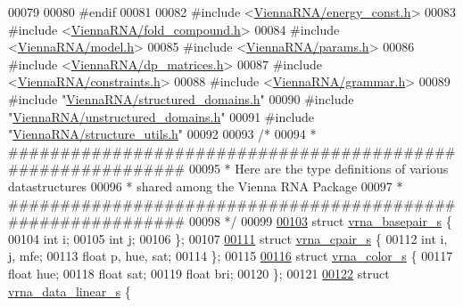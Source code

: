 \begin{DoxyCode}
00079 
00080 \textcolor{preprocessor}{#endif}
00081 
00082 \textcolor{preprocessor}{#include <\hyperlink{energy__const_8h}{ViennaRNA/energy\_const.h}>}
00083 \textcolor{preprocessor}{#include <\hyperlink{fold__compound_8h}{ViennaRNA/fold\_compound.h}>}
00084 \textcolor{preprocessor}{#include <\hyperlink{model_8h}{ViennaRNA/model.h}>}
00085 \textcolor{preprocessor}{#include <\hyperlink{params_8h}{ViennaRNA/params.h}>}
00086 \textcolor{preprocessor}{#include <\hyperlink{dp__matrices_8h}{ViennaRNA/dp\_matrices.h}>}
00087 \textcolor{preprocessor}{#include <\hyperlink{constraints_8h}{ViennaRNA/constraints.h}>}
00088 \textcolor{preprocessor}{#include <\hyperlink{grammar_8h}{ViennaRNA/grammar.h}>}
00089 \textcolor{preprocessor}{#include "\hyperlink{structured__domains_8h}{ViennaRNA/structured\_domains.h}"}
00090 \textcolor{preprocessor}{#include "\hyperlink{unstructured__domains_8h}{ViennaRNA/unstructured\_domains.h}"}
00091 \textcolor{preprocessor}{#include "\hyperlink{structure__utils_8h}{ViennaRNA/structure\_utils.h}"}
00092 
00093 \textcolor{comment}{/*}
00094 \textcolor{comment}{ * ############################################################}
00095 \textcolor{comment}{ * Here are the type definitions of various datastructures}
00096 \textcolor{comment}{ * shared among the Vienna RNA Package}
00097 \textcolor{comment}{ * ############################################################}
00098 \textcolor{comment}{ */}
00099 
\hyperlink{group__data__structures}{00103} \textcolor{keyword}{struct }\hyperlink{group__data__structures_structvrna__basepair__s}{vrna\_basepair\_s} \{
00104   \textcolor{keywordtype}{int} i;
00105   \textcolor{keywordtype}{int} j;
00106 \};
00107 
\hyperlink{group__data__structures}{00111} \textcolor{keyword}{struct }\hyperlink{group__data__structures_structvrna__cpair__s}{vrna\_cpair\_s} \{
00112   \textcolor{keywordtype}{int}   i, j, mfe;
00113   \textcolor{keywordtype}{float} p, hue, sat;
00114 \};
00115 
\hyperlink{group__data__structures}{00116} \textcolor{keyword}{struct }\hyperlink{group__data__structures_structvrna__color__s}{vrna\_color\_s} \{
00117   \textcolor{keywordtype}{float} hue;
00118   \textcolor{keywordtype}{float} sat;
00119   \textcolor{keywordtype}{float} bri;
00120 \};
00121 
\hyperlink{group__data__structures}{00122} \textcolor{keyword}{struct }\hyperlink{group__data__structures_structvrna__data__linear__s}{vrna\_data\_linear\_s} \{

\end{DoxyCode}
